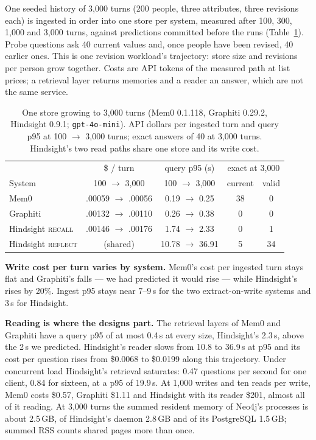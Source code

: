 \documentclass[conference]{IEEEtran}
\begin{document}
One seeded history of 3{,}000 turns (200 people, three attributes, three
revisions each) is ingested in order into one store per system, measured after
100, 300, 1{,}000 and 3{,}000 turns, against predictions committed before the
runs (Table~\ref{tab:growth}). Probe questions ask 40 current values and, once
people have been revised, 40 earlier ones. This is one revision workload's
trajectory: store size and revisions per person grow together. Costs are API
tokens of the measured path at list prices; a retrieval layer returns memories
and a reader an answer, which are not the same service.

\begin{table}[t]
\centering
\caption{One store growing to 3{,}000 turns (Mem0 0.1.118, Graphiti 0.29.2,
Hindsight 0.9.1; \texttt{gpt-4o-mini}). API dollars per
ingested turn and query p95 at 100 $\to$ 3{,}000 turns; exact answers of 40 at
3{,}000 turns. Hindsight's two read paths share one store and its write cost.}
\label{tab:growth}
\footnotesize
\setlength{\tabcolsep}{2.2pt}
\begin{tabular}{@{}lcccc@{}}
\toprule
 & \$ / turn & query p95 (s) & \multicolumn{2}{c}{exact at 3{,}000} \\
System & 100 $\to$ 3{,}000 & 100 $\to$ 3{,}000 & current & valid \\
\midrule
Mem0                & .00059 $\to$ .00056 & 0.19 $\to$ 0.25 & 38 & 0 \\
Graphiti            & .00132 $\to$ .00110 & 0.26 $\to$ 0.38 & 0  & 0 \\
Hindsight \textsc{recall}  & .00146 $\to$ .00176 & 1.74 $\to$ 2.33 & 0  & 1 \\
Hindsight \textsc{reflect} & (shared)           & 10.78 $\to$ 36.91 & 5 & 34 \\
\bottomrule
\end{tabular}
\end{table}

\textbf{Write cost per turn varies by system.} Mem0's cost per ingested turn stays
flat and Graphiti's falls --- we had predicted it would rise --- while
Hindsight's rises by 20\%. Ingest p95 stays near 7--9\,s for the two
extract-on-write systems and 3\,s for Hindsight.

\textbf{Reading is where the designs part.} The retrieval layers of Mem0 and
Graphiti have a query p95 of at most 0.4\,s at every size, Hindsight's 2.3\,s, above the
2\,s we predicted. Hindsight's reader slows from 10.8 to 36.9\,s at p95 and its
cost per question rises from \$0.0068 to \$0.0199 along this trajectory. Under
concurrent load Hindsight's retrieval saturates: 0.47 questions per second for
one client, 0.84 for sixteen, at a p95 of 19.9\,s. At 1{,}000 writes and ten
reads per write, Mem0 costs \$0.57, Graphiti \$1.11 and Hindsight with its
reader \$201, almost all of it reading. At 3{,}000 turns the summed resident
memory of Neo4j's processes is about 2.5\,GB, of Hindsight's daemon 2.8\,GB and
of its PostgreSQL 1.5\,GB; summed RSS counts shared pages more than once.
\end{document}
